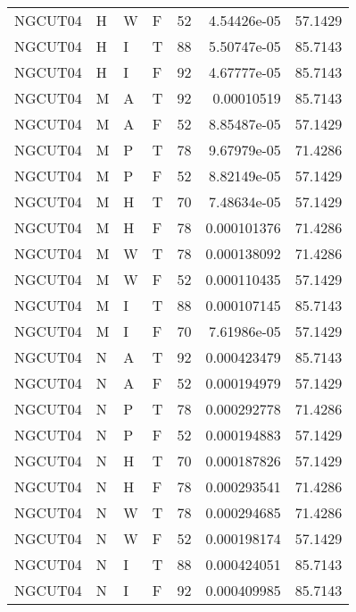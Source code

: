 \begin{table}[!htb]
{\begin{tabular}{llllrrr}
            NGCUT04  & H     & W     & F          & 52         & 4.54426e-05 & 57.1429  \\
            NGCUT04  & H     & I     & T          & 88         & 5.50747e-05 & 85.7143  \\
            NGCUT04  & H     & I     & F          & 92         & 4.67777e-05 & 85.7143  \\
            NGCUT04  & M     & A     & T          & 92         & 0.00010519  & 85.7143  \\
            NGCUT04  & M     & A     & F          & 52         & 8.85487e-05 & 57.1429  \\
            NGCUT04  & M     & P     & T          & 78         & 9.67979e-05 & 71.4286  \\
            NGCUT04  & M     & P     & F          & 52         & 8.82149e-05 & 57.1429  \\
            NGCUT04  & M     & H     & T          & 70         & 7.48634e-05 & 57.1429  \\
            NGCUT04  & M     & H     & F          & 78         & 0.000101376 & 71.4286  \\
            NGCUT04  & M     & W     & T          & 78         & 0.000138092 & 71.4286  \\
            NGCUT04  & M     & W     & F          & 52         & 0.000110435 & 57.1429  \\
            NGCUT04  & M     & I     & T          & 88         & 0.000107145 & 85.7143  \\
            NGCUT04  & M     & I     & F          & 70         & 7.61986e-05 & 57.1429  \\
            NGCUT04  & N     & A     & T          & 92         & 0.000423479 & 85.7143  \\
            NGCUT04  & N     & A     & F          & 52         & 0.000194979 & 57.1429  \\
            NGCUT04  & N     & P     & T          & 78         & 0.000292778 & 71.4286  \\
            NGCUT04  & N     & P     & F          & 52         & 0.000194883 & 57.1429  \\
            NGCUT04  & N     & H     & T          & 70         & 0.000187826 & 57.1429  \\
            NGCUT04  & N     & H     & F          & 78         & 0.000293541 & 71.4286  \\
            NGCUT04  & N     & W     & T          & 78         & 0.000294685 & 71.4286  \\
            NGCUT04  & N     & W     & F          & 52         & 0.000198174 & 57.1429  \\
            NGCUT04  & N     & I     & T          & 88         & 0.000424051 & 85.7143  \\
            NGCUT04  & N     & I     & F          & 92         & 0.000409985 & 85.7143  \\
            \hline
        \end{tabular}
    }{}
\end{table}